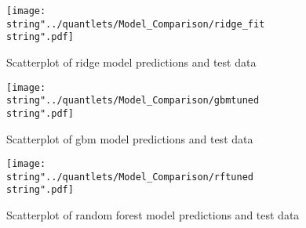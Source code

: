 \begin{figure}[H]
\centering
	\texttt{[image: \\string"../quantlets/Model\_Comparison/ridge\_fit\\string".pdf]}
  	\caption{Scatterplot of ridge model predictions and test data}
  	\label{fig:ridge}
\end{figure}

\begin{figure}[H]
\centering
	\texttt{[image: \\string"../quantlets/Model\_Comparison/gbmtuned\\string".pdf]}
  	\caption{Scatterplot of gbm model predictions and test data}
  	\label{fig:gbm}
\end{figure}

\begin{figure}[H]
\centering
	\texttt{[image: \\string"../quantlets/Model\_Comparison/rftuned\\string".pdf]}
  	\caption{Scatterplot of random forest model predictions and test data}
  	\label{fig:rf}
\end{figure}

